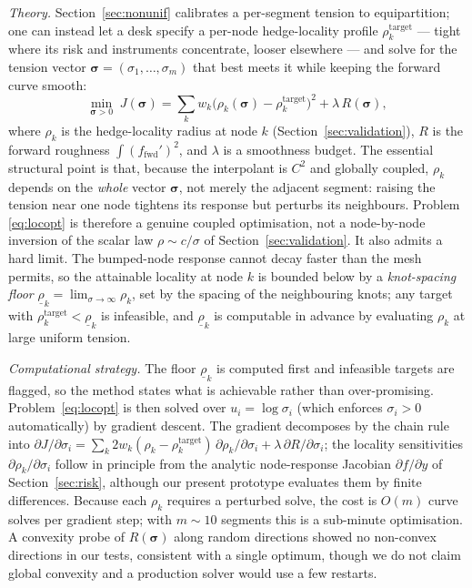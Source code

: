 \documentclass[10pt]{article}
\begin{document}
\emph{Theory.} Section~\ref{sec:nonunif} calibrates a per-segment tension to equipartition; one
can instead let a desk specify a per-node hedge-locality profile $\rho_k^{\mathrm{target}}$ ---
tight where its risk and instruments concentrate, looser elsewhere --- and solve for the tension
vector $\boldsymbol{\sigma}=(\sigma_1,\dots,\sigma_m)$ that best meets it while keeping the
forward curve smooth:
\begin{equation}
\min_{\boldsymbol{\sigma}>0}\;
J(\boldsymbol{\sigma})=\sum_k w_k\big(\rho_k(\boldsymbol{\sigma})-\rho_k^{\mathrm{target}}\big)^2
+\lambda\,R(\boldsymbol{\sigma}),
\label{eq:locopt}
\end{equation}
where $\rho_k$ is the hedge-locality radius at node $k$ (Section~\ref{sec:validation}), $R$ is the
forward roughness $\int(f_{\mathrm{fwd}}')^2$, and $\lambda$ is a smoothness budget. The essential
structural point is that, because the interpolant is $C^2$ and globally coupled, $\rho_k$ depends
on the \emph{whole} vector $\boldsymbol{\sigma}$, not merely the adjacent segment: raising the
tension near one node tightens its response but perturbs its neighbours. Problem
\eqref{eq:locopt} is therefore a genuine coupled optimisation, not a node-by-node inversion of the
scalar law $\rho\sim c/\sigma$ of Section~\ref{sec:validation}. It also admits a hard limit. The
bumped-node response cannot decay faster than the mesh permits, so the attainable locality at node
$k$ is bounded below by a \emph{knot-spacing floor} $\underline{\rho}_k=\lim_{\sigma\to\infty}
\rho_k$, set by the spacing of the neighbouring knots; any target with
$\rho_k^{\mathrm{target}}<\underline{\rho}_k$ is infeasible, and $\underline{\rho}_k$ is
computable in advance by evaluating $\rho_k$ at large uniform tension.

\emph{Computational strategy.} The floor $\underline{\rho}_k$ is computed first and infeasible
targets are flagged, so the method states what is achievable rather than over-promising.
Problem~\eqref{eq:locopt} is then solved over $u_i=\log\sigma_i$ (which enforces
$\sigma_i>0$ automatically) by gradient descent. The gradient decomposes by the chain rule into
$\partial J/\partial\sigma_i = \sum_k 2w_k(\rho_k-\rho_k^{\mathrm{target}})\,
\partial\rho_k/\partial\sigma_i + \lambda\,\partial R/\partial\sigma_i$; the locality
sensitivities $\partial\rho_k/\partial\sigma_i$ follow in principle from the analytic
node-response Jacobian $\partial f/\partial y$ of Section~\ref{sec:risk}, although our present
prototype evaluates them by finite differences. Because each $\rho_k$ requires a perturbed solve,
the cost is $O(m)$ curve solves per gradient step; with $m\!\sim\!10$ segments this is a
sub-minute optimisation. A convexity probe of $R(\boldsymbol{\sigma})$ along random directions
showed no non-convex directions in our tests, consistent with a single optimum, though we do not
claim global convexity and a production solver would use a few restarts.
\end{document}
